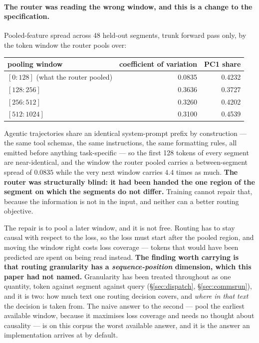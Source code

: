 \documentclass[11pt]{article}
\begin{document}
\paragraph{The router was reading the wrong window, and this is a change to the specification.} Pooled-feature spread across 48 held-out segments, trunk forward pass only, by the token window the router pools over:

\begin{center}
\begin{tabular}{@{}lrr@{}}
\toprule
pooling window & coefficient of variation & PC1 share \\
\midrule
$[0{:}128]$ \quad (what the router pooled) & 0.0835 & 0.4232 \\
$[128{:}256]$ & 0.3636 & 0.3727 \\
$[256{:}512]$ & 0.3260 & 0.4202 \\
$[512{:}1024]$ & 0.3100 & 0.4539 \\
\bottomrule
\end{tabular}
\end{center}

Agentic trajectories share an identical system-prompt prefix by construction --- the same tool schemas, the same instructions, the same formatting rules, all emitted before anything task-specific --- so the first 128 tokens of every segment are near-identical, and the window the router pooled carries a between-segment spread of $0.0835$ while the very next window carries $4.4$ times as much. \textbf{The router was structurally blind: it had been handed the one region of the segment on which the segments do not differ.} Training cannot repair that, because the information is not in the input, and neither can a better routing objective.

The repair is to pool a later window, and it is not free. Routing has to stay causal with respect to the loss, so the loss must start after the pooled region, and moving the window right costs loss coverage --- tokens that would have been predicted are spent on being read instead. \textbf{The finding worth carrying is that routing granularity has a \emph{sequence-position} dimension, which this paper had not named.} Granularity has been treated throughout as one quantity, token against segment against query (\S\ref{sec:dispatch}, \S\ref{sec:commsrun}), and it is two: how much text one routing decision covers, and \emph{where in that text} the decision is taken from. The naive answer to the second --- pool the earliest available window, because it maximises loss coverage and needs no thought about causality --- is on this corpus the worst available answer, and it is the answer an implementation arrives at by default.
\end{document}
